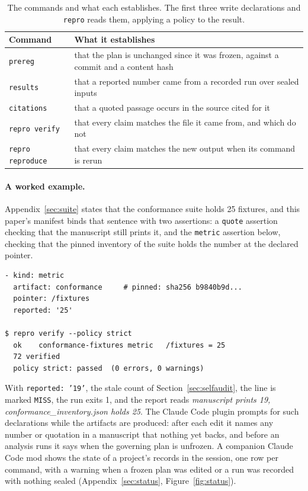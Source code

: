 \documentclass{article}
\newcommand{\code}[1]{\texttt{#1}}
\newcommand{\tPlan}{\code{prereg}}
\newcommand{\tRun}{\code{results}}
\newcommand{\tCite}{\code{citations}}
\newcommand{\tVerify}{\code{repro}}
\newcommand{\tVerifyCmd}{\code{repro verify}}
\begin{document}
\begin{table}[h]
\centering
\small
\caption{The commands and what each establishes. The first three write declarations and
\tVerify{} reads them, applying a policy to the result.}
\label{tab:commands}
\begin{tabular}{@{}l>{\raggedright\arraybackslash}p{}@{}}
\toprule
\textbf{Command} & \textbf{What it establishes} \\
\midrule
\tPlan{} & that the plan is unchanged since it was frozen, against a commit and a content hash \\
\tRun{} & that a reported number came from a recorded run over sealed inputs \\
\tCite{} & that a quoted passage occurs in the source cited for it \\
\tVerifyCmd{} & that every claim matches the file it came from, and which do not \\
\code{repro reproduce} & that every claim matches the new output when its command is rerun \\
\bottomrule
\end{tabular}
\end{table}

\paragraph{A worked example.} Appendix~\ref{sec:suite} states that the conformance suite holds 25
fixtures, and this paper's manifest binds that sentence with two assertions: a \code{quote}
assertion checking that the manuscript still prints it, and the \code{metric} assertion below,
checking that the pinned inventory of the suite holds the number at the declared pointer.
{\footnotesize
\begin{verbatim}
- kind: metric
  artifact: conformance     # pinned: sha256 b9840b9d...
  pointer: /fixtures
  reported: '25'

$ repro verify --policy strict
  ok    conformance-fixtures metric   /fixtures = 25
  72 verified
  policy strict: passed  (0 errors, 0 warnings)
\end{verbatim}}
\noindent With \code{reported: '19'}, the stale count of Section~\ref{sec:selfaudit}, the line is
marked \code{MISS}, the run exits 1, and the report reads \emph{manuscript prints 19,
conformance\_inventory.json holds 25}. The Claude Code plugin prompts for such
declarations while the artifacts are produced: after each edit it names any number or quotation in
a manuscript that nothing yet backs, and before an analysis runs it says when the governing plan is
unfrozen. A companion Claude Code mod shows the state of a project's
records in the session, one row per command, with a warning when a frozen plan was edited or a run
was recorded with nothing sealed (Appendix~\ref{sec:status}, Figure~\ref{fig:status}).
\end{document}
